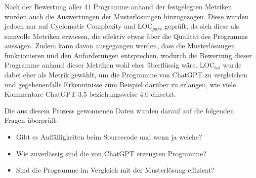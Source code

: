 \documentclass[class=scrbook, crop=false]{standalone}
\begin{document}
    Nach der Bewertung aller 41 Programme anhand der festgelegten Metriken wurden auch die Auswertungen der Musterlösungen hinzugezogen.
    Diese wurden jedoch nur auf Cyclomatic Complexity und LOC$_{pars}$ geprüft, da sich diese als sinnvolle Metriken erwiesen, die effektiv etwas über die
    Qualität des Programms aussagen.
    Zudem kann davon ausgegangen werden, dass die Musterlösungen funktionieren und den Anforderungen entsprechen, wodurch die Bewertung dieser Programme anhand
    dieser Metriken wohl eher überflüssig wäre.
    LOC$_{tot}$ wurde dabei eher als Metrik gewählt, um die Programme von ChatGPT zu vergleichen und gegebenenfalls Erkenntnisse zum Beispiel darüber zu erlangen,
    wie viele Kommentare ChatGPT 3.5 beziehungsweise 4.0 einsetzt.

    Die aus diesem Prozess gewonnenen Daten wurden darauf auf die folgenden Fragen überprüft:
    \begin{itemize}
        \item Gibt es Auffälligkeiten beim Sourcecode und wenn ja welche?
        \item Wie zuverlässig sind die von ChatGPT erzeugten Programme?
        \item Sind die Programme im Vergleich mit der Musterlösung effizient?
    \end{itemize}
\end{document}
